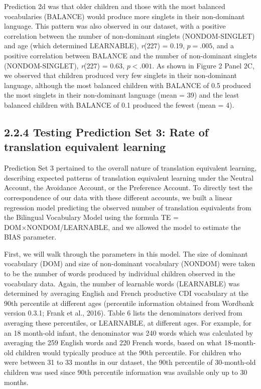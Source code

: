 \documentclass[
  english,
  ,man,floatsintext]{apa6}
\begin{document}
Prediction 2d was that older children and those with the most balanced vocabularies (BALANCE) would produce more singlets in their non-dominant language. This pattern was also observed in our dataset, with a positive correlation between the number of non-dominant singlets (NONDOM-SINGLET) and age (which determined LEARNABLE), \emph{r}(227) = 0.19, \(p = .005\), and a positive correlation between BALANCE and the number of non-dominant singlets (NONDOM-SINGLET), \emph{r}(227) = 0.63, \(p < .001\). As shown in Figure 2 Panel 2C, we observed that children produced very few singlets in their non-dominant language, although the most balanced children with BALANCE of 0.5 produced the most singlets in their non-dominant language (mean = 39) and the least balanced children with BALANCE of 0.1 produced the fewest (mean = 4).

\hypertarget{testing-prediction-set-3-rate-of-translation-equivalent-learning}{%
\subsection{2.2.4 Testing Prediction Set 3: Rate of translation equivalent learning}\label{testing-prediction-set-3-rate-of-translation-equivalent-learning}}

Prediction Set 3 pertained to the overall nature of translation equivalent learning, describing expected patterns of translation equivalent learning under the Neutral Account, the Avoidance Account, or the Preference Account. To directly test the correspondence of our data with these different accounts, we built a linear regression model predicting the observed number of translation equivalents from the Bilingual Vocabulary Model using the formula TE = DOM×NONDOM/LEARNABLE, and we allowed the model to estimate the BIAS parameter.

First, we will walk through the parameters in this model. The size of dominant vocabulary (DOM) and size of non-dominant vocabulary (NONDOM) were taken to be the number of words produced by individual children observed in the vocabulary data. Again, the number of learnable words (LEARNABLE) was determined by averaging English and French productive CDI vocabulary at the 90th percentile at different ages (percentile information obtained from Wordbank version 0.3.1; Frank et al., 2016). Table 6 lists the denominators derived from averaging these percentiles, or LEARNABLE, at different ages. For example, for an 18 month-old infant, the denominator was 240 words which was calculated by averaging the 259 English words and 220 French words, based on what 18-month-old children would typically produce at the 90th percentile. For children who were between 31 to 33 months in our dataset, the 90th percentile of 30-month-old children was used since 90th percentile information was available only up to 30 months.
\end{document}
